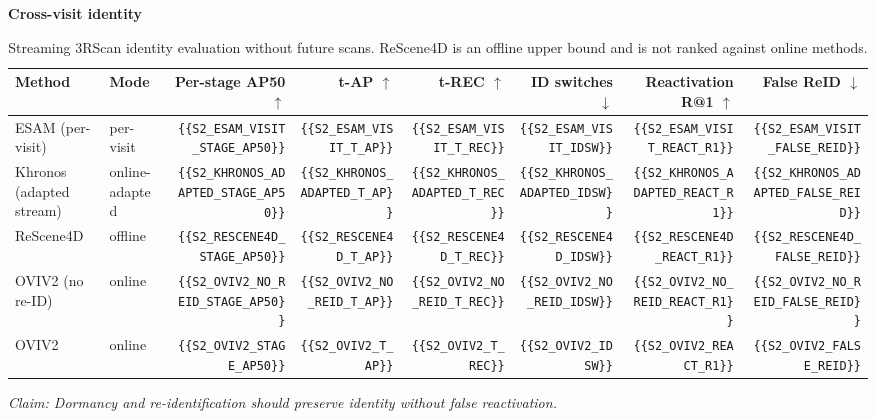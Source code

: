 \begin{table}[t]
\centering
\caption{Streaming 3RScan identity evaluation without future scans. ReScene4D is an offline upper bound and is not ranked against online methods.}
\label{tab:supp_temporal_identity}
\small
\textbf{Cross-visit identity}\\
\begin{tabular}{llrrrrrr}
\toprule
Method & Mode & Per-stage AP50 $\uparrow$ & t-AP $\uparrow$ & t-REC $\uparrow$ & ID switches $\downarrow$ & Reactivation R@1 $\uparrow$ & False ReID $\downarrow$ \\
\midrule
ESAM (per-visit) & per-visit & \verb|{{S2_ESAM_VISIT_STAGE_AP50}}| & \verb|{{S2_ESAM_VISIT_T_AP}}| & \verb|{{S2_ESAM_VISIT_T_REC}}| & \verb|{{S2_ESAM_VISIT_IDSW}}| & \verb|{{S2_ESAM_VISIT_REACT_R1}}| & \verb|{{S2_ESAM_VISIT_FALSE_REID}}| \\
Khronos (adapted stream) & online-adapted & \verb|{{S2_KHRONOS_ADAPTED_STAGE_AP50}}| & \verb|{{S2_KHRONOS_ADAPTED_T_AP}}| & \verb|{{S2_KHRONOS_ADAPTED_T_REC}}| & \verb|{{S2_KHRONOS_ADAPTED_IDSW}}| & \verb|{{S2_KHRONOS_ADAPTED_REACT_R1}}| & \verb|{{S2_KHRONOS_ADAPTED_FALSE_REID}}| \\
ReScene4D & offline & \verb|{{S2_RESCENE4D_STAGE_AP50}}| & \verb|{{S2_RESCENE4D_T_AP}}| & \verb|{{S2_RESCENE4D_T_REC}}| & \verb|{{S2_RESCENE4D_IDSW}}| & \verb|{{S2_RESCENE4D_REACT_R1}}| & \verb|{{S2_RESCENE4D_FALSE_REID}}| \\
OVIV2 (no re-ID) & online & \verb|{{S2_OVIV2_NO_REID_STAGE_AP50}}| & \verb|{{S2_OVIV2_NO_REID_T_AP}}| & \verb|{{S2_OVIV2_NO_REID_T_REC}}| & \verb|{{S2_OVIV2_NO_REID_IDSW}}| & \verb|{{S2_OVIV2_NO_REID_REACT_R1}}| & \verb|{{S2_OVIV2_NO_REID_FALSE_REID}}| \\
OVIV2 & online & \verb|{{S2_OVIV2_STAGE_AP50}}| & \verb|{{S2_OVIV2_T_AP}}| & \verb|{{S2_OVIV2_T_REC}}| & \verb|{{S2_OVIV2_IDSW}}| & \verb|{{S2_OVIV2_REACT_R1}}| & \verb|{{S2_OVIV2_FALSE_REID}}| \\
\bottomrule
\end{tabular}
\par
\smallskip
\noindent\textit{Claim: Dormancy and re-identification should preserve identity without false reactivation.}
\end{table}

